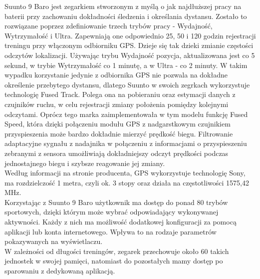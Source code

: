 \documentclass[a4paper,12pt,reqno]{article}
\begin{document}
Suunto 9 Baro jest zegarkiem stworzonym z myślą o jak najdłuższej pracy na baterii przy zachowaniu dokładności śledzenia i określania dystansu. Zostało to rozwiązane poprzez zdefiniowanie trzech trybów pracy - Wydajność, Wytrzymałość i Ultra. Zapewniają one odpowiednio 25, 50 i 120 godzin rejestracji treningu przy włączonym odbiorniku GPS. Dzieje się tak dzieki zmianie częstości odczytów lokalizacji. Używając trybu Wydajność pozycja, aktualizowana jest co 5 sekund, w trybie Wytrzymałość co 1 minutę, a w Ultra - co 2 minuty. W takim wypadku korzystanie jedynie z odbiornika GPS nie pozwala na dokładne określenie przebytego dystansu, dlatego Suunto w swoich zegrkach wykorzystuje technologię Fused Track. Polega ona na pobieraniu oraz estymacji danych z czujników ruchu, w celu rejestracji zmiany położenia pomiędzy kolejnymi odczytami. Oprócz tego marka zaimplementowała w tym modelu funkcję Fused Speed, która dzięki połączeniu modułu GPS z nadgarstkowym czujnikiem przyspieszenia może bardzo dokładnie mierzyć prędkość biegu. Filtrowanie adaptacyjne sygnału z nadajnika w połączeniu z informacjami o przyspieszeniu zebranymi z sensora umożliwiają dokładniejszy odczyt prędkości podczas jednostajnego biegu i szybsze reagowanie jej zmiany.\\

Według informacji na stronie producenta, GPS wykorzystuje technologię Sony, ma rozdzielczość 1 metra, czyli ok. 3 stopy oraz działa na częstotliwości 1575,42 MHz.\\

Korzystając z Suunto 9 Baro użytkownik ma dostęp do ponad 80 trybów sportowych, dzięki którym może wybrać odpowiadający wykonywanej aktywności. Każdy z nich ma możliwość dodatkowej konfiguracji za pomocą aplikacji lub konta internetowego. Wpływa to na rodzaje parametrów pokazywanych na wyświetlaczu.\\

W zależności od długości treningów, zegarek przechowuje około 60 takich jednostek w swojej pamięci, natomiast do pozostałych mamy dostęp po sparowaniu z dedykowaną aplikacją.\\
\end{document}
